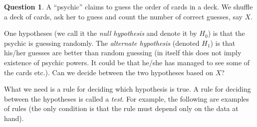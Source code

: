 \documentclass[preprint,  11pt]{amsart}
\theoremstyle{plain} %
\theoremstyle{definition} %
\newtheorem{question}[theorem]{Question}
\begin{document}


\begin{question} A ``psychic'' claims to guess the order of cards in a deck. We shuffle a deck of cards, ask her to guess and count the number of correct guesses, say $X$. 

\medskip
One hypotheses (we call it the {\em null hypothesis} and denote it by $H_{0}$) is that the psychic is guessing randomly. The {\em alternate hypothesis} (denoted $H_{1}$) is that his/her guesses are better than random guessing (in itself this does not imply existence of psychic powers. It could be that he/she has managed to see some of the cards etc.). Can we decide between the two hypotheses based on $X$?
\end{question}

What we need is a rule for deciding which hypothesis is true. A rule for deciding between the hypotheses is called a {\em test}. For example, the following are examples of rules (the only condition is that the rule must depend only on the data at hand).
\end{document}
